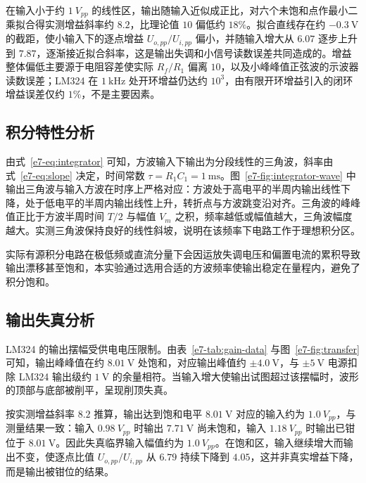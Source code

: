 在输入小于约 \(\SI{1}{V_{pp}}\) 的线性区，输出随输入近似成正比，对六个未饱和点作最小二乘拟合得实测增益斜率约 \(8.2\)，比理论值 \(10\) 偏低约 \(18\%\)。拟合直线存在约 \(-\SI{0.3}{\volt}\) 的截距，使小输入下的逐点增益 \(U_{o,pp}/U_{i,pp}\) 偏小，并随输入增大从 \(6.07\) 逐步上升到 \(7.87\)，逐渐接近拟合斜率，这是输出失调和小信号读数误差共同造成的。增益整体偏低主要源于电阻容差使实际 \(R_f/R_1\) 偏离 \(10\)，以及小峰峰值正弦波的示波器读数误差；LM324 在 \(\SI{1}{\kilo\hertz}\) 处开环增益仍达约 \(10^3\)，由有限开环增益引入的闭环增益误差仅约 \(1\%\)，不是主要因素。

\subsection{积分特性分析}

由式~\eqref{e7-eq:integrator} 可知，方波输入下输出为分段线性的三角波，斜率由式~\eqref{e7-eq:slope} 决定，时间常数 \(\tau=R_1 C_1=\SI{1}{\milli\second}\)。图~\ref{e7-fig:integrator-wave} 中输出三角波与输入方波在时序上严格对应：方波处于高电平的半周内输出线性下降，处于低电平的半周内输出线性上升，转折点与方波跳变沿对齐。三角波的峰峰值正比于方波半周时间 \(T/2\) 与幅值 \(V_m\) 之积，频率越低或幅值越大，三角波幅度越大。实测三角波保持良好的线性斜坡，说明在该频率下电路工作于理想积分区。

实际有源积分电路在极低频或直流分量下会因运放失调电压和偏置电流的累积导致输出漂移甚至饱和，本实验通过选用合适的方波频率使输出稳定在量程内，避免了积分饱和。

\subsection{输出失真分析}

LM324 的输出摆幅受供电电压限制。由表~\ref{e7-tab:gain-data} 与图~\ref{e7-fig:transfer} 可知，输出峰峰值在约 \(\SI{8.01}{\volt}\) 处饱和，对应输出峰值约 \(\pm\SI{4.0}{\volt}\)，与 \(\pm\SI{5}{\volt}\) 电源扣除 LM324 输出级约 \(\SI{1}{\volt}\) 的余量相符。当输入增大使输出试图超过该摆幅时，波形的顶部与底部被削平，呈现削顶失真。

按实测增益斜率 \(8.2\) 推算，输出达到饱和电平 \(\SI{8.01}{\volt}\) 对应的输入约为 \(\SI{1.0}{V_{pp}}\)，与测量结果一致：输入 \(\SI{0.98}{V_{pp}}\) 时输出 \(\SI{7.71}{\volt}\) 尚未饱和，输入 \(\SI{1.18}{V_{pp}}\) 时输出已钳位于 \(\SI{8.01}{\volt}\)。因此失真临界输入幅值约为 \(\SI{1.0}{V_{pp}}\)。在饱和区，输入继续增大而输出不变，使逐点比值 \(U_{o,pp}/U_{i,pp}\) 从 \(6.79\) 持续下降到 \(4.05\)，这并非真实增益下降，而是输出被钳位的结果。

